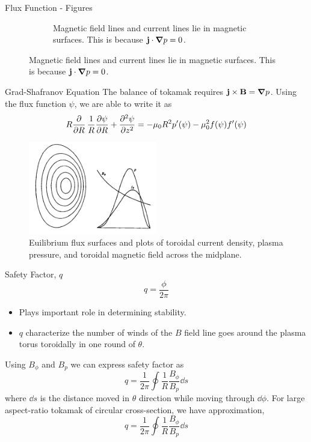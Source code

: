 \begin{frame} {Flux Function - Figures}
\begin{figure}
\begin{subfigure}{0.45\textwidth}
      \caption{Magnetic field lines and current lines lie in magnetic surfaces. This is because $\mathbf{j}\cdot\grad p =0$.}
    \end{subfigure}
    \label{fig:magnetic-flux-surfaces}
  \end{figure}
\end{frame}

\begin{frame} {Grad-Shafranov Equation}
  The balance of tokamak requires $\mathbf{j\times B} = \grad p$. Using the flux function $\psi$, we are able to write it as
  \begin{equation}
    R\pdv{R}\,\frac{1}{R}\pdv{\psi}{R} + \pdv[2]{\psi}{z} = -\mu_0R^2p'(\psi) - \mu_0^2f(\psi)f'(\psi)
    \label{eq:grad-shafranov}
  \end{equation}

  \begin{figure}
    \centering
    \includegraphics[width=0.5\textwidth]{figures/profiles.png}
    \caption{Euilibrium flux surfaces and plots of toroidal current density, plasma pressure, and toroidal magnetic field across the midplane.}
    \label{fig:profiles}
  \end{figure}
\end{frame}

\begin{frame} {Safety Factor, $q$}
  \begin{equation}
    q = \frac{\phi}{2\pi}
    \label{eq:safety-factor-definition}
  \end{equation}

  \begin{itemize}
    \item Plays important role in determining stability.
    \item $q$ characterize the number of winds of the $B$ field line goes around the plasma torus toroidally in one round of $\theta$.
  \end{itemize}

  Using $B_\phi$ and $B_p$ we can express safety factor as
  \begin{equation}
    q = \frac{1}{2\pi} \oint \frac{1}{R}\frac{B_\phi}{B_p}\dd{s}
    \label{eq:safety-factor}
  \end{equation}
  where $\dd{s}$ is the distance moved in $\theta$ direction while moving through $\dd{\phi}$. For large aspect-ratio tokamak of circular cross-section, we have approximation,
  \begin{equation}
    q = \frac{1}{2\pi} \oint \frac{1}{R}\frac{B_\phi}{B_p}\dd{s}
    \label{eq:safety-factor-large-aspect-ratio}
  \end{equation}
\end{frame}

